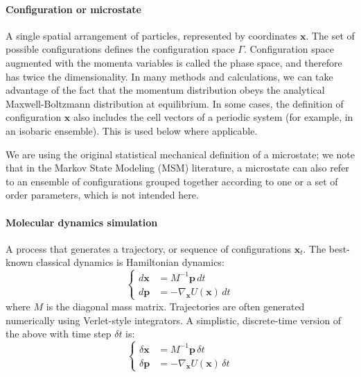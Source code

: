 \documentclass[9pt,review]{livecoms}
\newcommand{\vx}{\mathbf{x}}
\newcommand{\vp}{\mathbf{p}}
\begin{document}
\hypertarget{ref:Microstate} {\paragraph{Configuration or microstate}}
A single spatial arrangement of particles, represented by coordinates $\vx$. The set of possible configurations defines the configuration space $\Gamma$.
Configuration space augmented with the momenta variables is called the phase space, and therefore has twice the dimensionality. In many methods and calculations, we can take advantage of the fact that the momentum distribution obeys the analytical Maxwell-Boltzmann distribution at equilibrium.
In some cases, the  definition of configuration $\vx$ also includes the cell vectors of a periodic system (for example, in an isobaric ensemble).  This is used below where applicable.

We are using the original statistical mechanical definition of a microstate; we note that in the Markov State Modeling (MSM) literature, a microstate can also refer to an ensemble of configurations grouped together according to one or a set of order parameters, which is not intended here.

\paragraph{Molecular dynamics simulation}
A process that generates a trajectory, or sequence of configurations $\vx_t$.
The best-known classical dynamics is Hamiltonian dynamics:
\begin{equation}
\left\{
\begin{array}{ll}
    d\vx &= M^{-1} \vp \,  dt \\
    d\vp &= -\nabla_\vx U(\vx) \, dt
\end{array}
\right.
    \label{eq:md}
\end{equation}
where $M$ is the diagonal mass matrix.
Trajectories are often generated numerically using Verlet-style integrators.
A simplistic, discrete-time version of the above with time step $\delta t$ is:
\begin{equation}
\left\{
\begin{array}{ll}
    \delta \vx &= M^{-1} \vp \, \delta t \\
    \delta \vp &= -\nabla_\vx U(\vx) \, \delta t
    \label{eq:md_discrete}
\end{array}
\right.
\end{equation}
\end{document}

